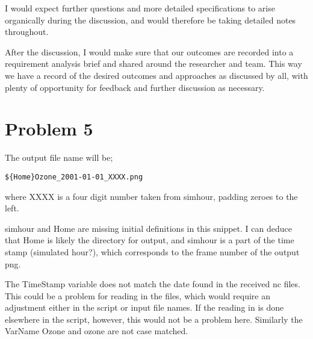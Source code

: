 \documentclass{article}
\begin{document}
I would expect further questions and more detailed specifications to arise organically during the discussion, and would therefore be taking detailed notes throughout.

After the discussion, I would make sure that our outcomes are recorded into a requirement analysis brief and shared around the researcher and team.
This way we have a record of the desired outcomes and approaches as discussed by all, with plenty of opportunity for feedback and further discussion as necessary.

\section*{Problem 5}

The output file name will be;

\begin{verbatim}${Home}Ozone_2001-01-01_XXXX.png\end{verbatim}

where XXXX is a four digit number taken from simhour, padding zeroes to the left.

simhour and Home are missing initial definitions in this snippet.
I can deduce that Home is likely the directory for output, and simhour is a part of the time stamp (simulated hour?), which corresponds to the frame number of the output png.

The TimeStamp variable does not match the date found in the received nc files.
This could be a problem for reading in the files, which would require an adjustment either in the script or input file names.
If the reading in is done elsewhere in the script, however, this would not be a problem here.
Similarly the VarName Ozone and ozone are not case matched.
\end{document}
